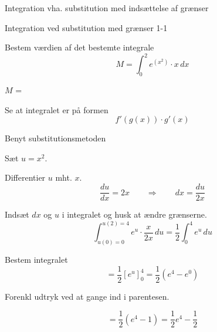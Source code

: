 \documentclass{article}
\begin{document}
Integration vha. substitution med indsættelse af grænser
\tableofcontents

\begin{exercise}{Integration ved substitution med grænser 1-1}
	
	
	Bestem værdien af det bestemte integrale
	\[
	M = \int_0^2 e^{(x^2)} \cdot x \, dx
	\]
	
	$M$ =  \\
	
	
	
	\hint
	
	Se at integralet er på formen
	\[
	f'(g(x)) \cdot g'(x)
	\]
	
	\hint
	
	Benyt substitutionsmetoden
	
	\hint
	
	Sæt $u=x^2$.
	
	
	\hint
	
	Differentier $u$ mht. $x$.
	\[
	\frac{du}{dx} = 2x \qquad	\Rightarrow \qquad dx = \frac{du}{2x}
	\]
	
	\hint
	
	Indsæt $dx$ og $u$ i integralet og husk at ændre grænserne.
	\[
	\int_{u(0)=0}^{u(2)=4} e^{u} \cdot \frac{x}{2x} \, du = \frac{1}{2} \int_{0}^{4} e^u \, du
	\]
	

	
	\hint
	
	Bestem integralet
	\[
	= \frac{1}{2} \left[e^u\right]_0^4 = \frac{1}{2} \left(  e^4-e^0 \right)
	\]
	
	\hint
	Forenkl udtryk ved at gange ind i parentesen.
	
	\hint
	
	\[
	= \frac{1}{2} \left(  e^4-1 \right) = \frac{1}{2} e^4 - \frac{1}{2}
	\]
	
	
	
\end{exercise}

\newpage
\end{document}
